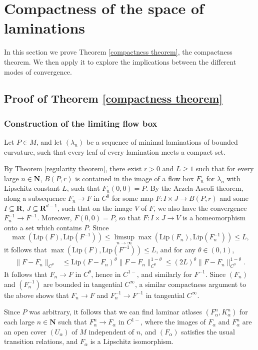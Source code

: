 \documentclass[reqno,11pt]{amsart}
\newcommand{\NN}{\mathbf{N}}
\newcommand{\RR}{\mathbf{R}}
\newcommand{\Lip}{\mathrm{Lip}}
\theoremstyle{definition}
\numberwithin{equation}{section}
\begin{document}
\section{Compactness of the space of laminations}\label{CompactnessSec}
In this section we prove Theorem \ref{compactness theorem}, the compactness theorem.
We then apply it to explore the implications between the different modes of convergence.


\subsection{Proof of Theorem \texorpdfstring{\ref{compactness theorem}}{C}}
\subsubsection{Construction of the limiting flow box}
Let $P \in M$, and let $(\lambda_n)$ be a sequence of minimal laminations of bounded curvature, such that every leaf of every lamination meets a compact set.

By Theorem \ref{regularity theorem}, there exist $r > 0$ and $L \geq 1$ such that for every large $n \in \NN$, $B(P, r)$ is contained in the image of a flow box $F_n$ for $\lambda_n$ with Lipschitz constant $L$, such that $F_n(0, 0) = P$.
By the Arzela-Ascoli theorem, along a subsequence $F_n \to F$ in $C^0$ for some map $F: I \times J \to B(P, r)$ and some $I \subseteq \RR$, $J \subseteq \RR^{d - 1}$, such that on the image $V$ of $F$, we also have the convergence $F_n^{-1} \to F^{-1}$.
Moreover, $F(0, 0) = P$, so that $F: I \times J \to V$ is a homeomorphism onto a set which contains $P$.
Since
$$\max(\Lip(F), \Lip(F^{-1})) \leq \limsup_{n \to \infty} \max(\Lip(F_n), \Lip(F_n^{-1})) \leq L,$$
it follows that $\max(\Lip(F), \Lip(F^{-1})) \leq L$, and for any $\theta \in (0, 1)$,
\begin{align*}
	\|F - F_n\|_{C^\theta}
	&\leq \Lip(F - F_n)^\theta \|F - F_n\|_{C^0}^{1 - \theta} \leq (2L)^\theta \|F - F_n\|_{C^0}^{1 - \theta}.
\end{align*}
It follows that $F_n \to F$ in $C^\theta$, hence in $C^{1-}$, and similarly for $F^{-1}$.
Since $(F_n)$ and $(F_n^{-1})$ are bounded in tangential $C^\infty$, a similar compactness argument to the above shows that $F_n \to F$ and $F_n^{-1} \to F^{-1}$ in tangential $C^\infty$.

Since $P$ was arbitrary, it follows that we can find laminar atlases $(F_\alpha^n, K_\alpha^n)$ for each large $n \in \NN$ such that $F_\alpha^n \to F_\alpha$ in $C^{1-}$, where the images of $F_\alpha$ and $F_\alpha^n$ are an open cover $(U_\alpha)$ of $M$ independent of $n$, and $(F_\alpha)$ satisfies the usual transition relations, and $F_\alpha$ is a Lipschitz isomorphism.
\end{document}
